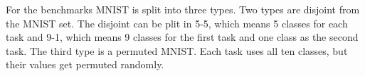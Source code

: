 For the benchmarks MNIST is split into three types.
Two types are disjoint from the MNIST set.
The disjoint can be plit in 5-5, which means 5 classes for each task and 9-1, which means 9 classes for the first task and one class as the second task.
The third type is a permuted MNIST.
Each task uses all ten classes, but their values get permuted randomly.
